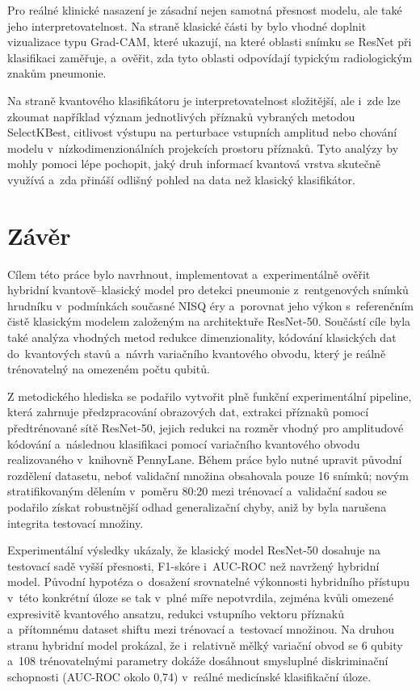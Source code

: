 \documentclass[12pt, a4paper]{report}
\begin{document}
Pro reálné klinické nasazení je zásadní nejen samotná přesnost modelu, ale také jeho interpretovatelnost. Na straně klasické části by bylo vhodné doplnit vizualizace typu Grad-CAM, které ukazují, na které oblasti snímku se ResNet při klasifikaci zaměřuje, a~ověřit, zda tyto oblasti odpovídají typickým radiologickým znakům pneumonie.

Na straně kvantového klasifikátoru je interpretovatelnost složitější, ale i~zde lze zkoumat například význam jednotlivých příznaků vybraných metodou SelectKBest, citlivost výstupu na perturbace vstupních amplitud nebo chování modelu v~nízkodimenzionálních projekcích prostoru příznaků. Tyto analýzy by mohly pomoci lépe pochopit, jaký druh informací kvantová vrstva skutečně využívá a~zda přináší odlišný pohled na data než klasický klasifikátor.


\chapter{Závěr} \label{chap:zaver}

Cílem této práce bylo navrhnout, implementovat a~experimentálně ověřit hybridní kvantově–klasický model pro detekci pneumonie z~rentgenových snímků hrudníku v~podmínkách současné NISQ éry a~porovnat jeho výkon s~referenčním čistě klasickým modelem založeným na architektuře ResNet-50. Součástí cíle byla také analýza vhodných metod redukce dimenzionality, kódování klasických dat do~kvantových stavů a~návrh variačního kvantového obvodu, který je reálně trénovatelný na omezeném počtu qubitů. 

Z metodického hlediska se podařilo vytvořit plně funkční experimentální pipeline, která zahrnuje předzpracování obrazových dat, extrakci příznaků pomocí předtrénované sítě ResNet-50, jejich redukci na rozměr vhodný pro amplitudové kódování a~následnou klasifikaci pomocí variačního kvantového obvodu realizovaného v~knihovně PennyLane. Během práce bylo nutné upravit původní rozdělení datasetu, neboť validační množina obsahovala pouze 16 snímků; novým stratifikovaným dělením v~poměru 80:20 mezi trénovací a~validační sadou se podařilo získat robustnější odhad generalizační chyby, aniž by byla narušena integrita testovací množiny.

Experimentální výsledky ukázaly, že klasický model ResNet-50 dosahuje na testovací sadě vyšší přesnosti, F1-skóre i~AUC-ROC než navržený hybridní model. Původní hypotéza o~dosažení srovnatelné výkonnosti hybridního přístupu v~této konkrétní úloze se tak v~plné míře nepotvrdila, zejména kvůli omezené expresivitě kvantového ansatzu, redukci vstupního vektoru příznaků a~přítomnému dataset shiftu mezi trénovací a~testovací množinou. Na druhou stranu hybridní model prokázal, že i~relativně mělký variační obvod se 6 qubity a~108 trénovatelnými parametry dokáže dosáhnout smysluplné diskriminační schopnosti (AUC-ROC okolo 0{,}74) v~reálné medicínské klasifikační úloze.
\end{document}
